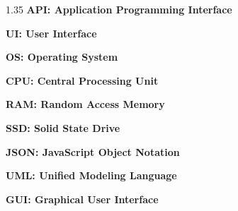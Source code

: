 \documentclass[12pt,a4paper]{article}
\begin{document}
\vspace{0.25cm}
\begin{spacing}{1.35}
\textbf{API: Application Programming Interface}\par
\vspace{0.35cm}
\textbf{UI: User Interface}\par
\vspace{0.35cm}
\textbf{OS: Operating System}\par
\vspace{0.35cm}
\textbf{CPU: Central Processing Unit}\par
\vspace{0.35cm}
\textbf{RAM: Random Access Memory}\par
\vspace{0.35cm}
\textbf{SSD: Solid State Drive}\par
\vspace{0.35cm}
\textbf{JSON: JavaScript Object Notation}\par
\vspace{0.35cm}
\textbf{UML: Unified Modeling Language}\par
\vspace{0.35cm}
\textbf{GUI: Graphical User Interface}\par
\end{spacing}
\end{document}
